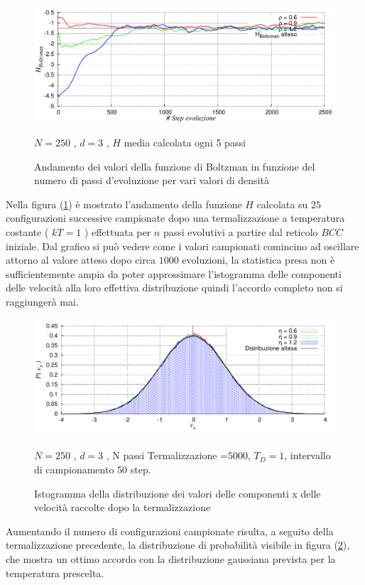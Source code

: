 \documentclass[11pt]{article}
\theoremstyle{plain}
\theoremstyle{remark}
\begin{document}
	\begin{figure}
		\centering
		\caption[Sfere Soffici$/$Preliminari\_Termalizzazione.cpp]{Andamento dei valori della funzione di Boltzman in funzione del numero di passi d'evoluzione per vari valori di densità}\label{fig: Termal H T_D Soffici}
		\includegraphics[scale=0.5]{Immagini/Soffici/Termal_HvsStep}

		\centering  \footnotesize{$N= 250$ , $d=3$ , $H$ media calcolata ogni 5 passi}
	\end{figure}
Nella figura (\ref{fig: Termal H T_D Soffici}) è mostrato l'andamento della funzione $H$ calcolata su $25$ configurazioni successive campionate dopo una termalizzazione a temperatura costante ( $kT=1$ ) effettuata per $n$ passi evolutivi a partire dal reticolo $BCC$ iniziale.
Dal grafico si può vedere come i valori campionati comincino ad oscillare attorno al valore atteso dopo circa $1000$ evoluzioni, la statistica presa non è sufficientemente ampia da poter approssimare l'istogramma delle componenti delle velocità alla loro effettiva distribuzione quindi l'accordo completo non si raggiungerà mai.

	\begin{figure}
		\centering
		\caption[Sfere Soffici$/$Preliminari\_Termalizzazione.cpp]{Istogramma della distribuzione dei valori delle componenti x delle velocità raccolte dopo la termalizzazione}\label{fig: Termal Isto T_D Soffici}
		\includegraphics[scale=0.5]{Immagini/Soffici/DistroVx}

		\centering  \footnotesize{$N= 250$ , $d=3$ , N passi Termalizzazione =$ 5000$, $T_D=1$, intervallo di campionamento 50 step.}
	\end{figure}
Aumentando il numero di configurazioni campionate risulta, a seguito della termalizzazione precedente, la distribuzione di probabilità visibile in figura (\ref{fig: Termal Isto T_D Soffici}), che mostra un ottimo accordo con la distribuzione gaussiana prevista per la temperatura prescelta.
\end{document}
